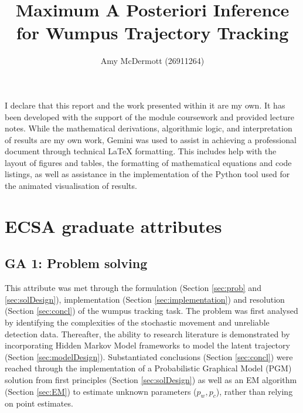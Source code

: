 \documentclass[10pt]{article}
\title{Maximum A Posteriori Inference for Wumpus Trajectory Tracking}
\author{Amy McDermott (26911264)}
\begin{document}
\maketitle
\vspace*{-1.5cm}

\section*{}
I declare that this report and the work presented within it are my own. 
It has been developed with the support of the module coursework and provided lecture notes. 
While the mathematical derivations, algorithmic logic, and interpretation of results are my own work, Gemini 
was used to assist in achieving a professional document through technical LaTeX formatting. 
This includes help with the layout of figures and tables, the formatting of mathematical equations and 
code listings, as well as assistance in the implementation of the Python tool used for the animated visualisation of results.

\section*{ECSA graduate attributes}

\subsection*{GA 1: Problem solving}
This attribute was met through the formulation (Section \ref{sec:prob} and \ref{sec:solDesign}), implementation (Section \ref{sec:implementation}) and resolution (Section \ref{sec:concl}) of the wumpus 
tracking task. The problem was first analysed by identifying the complexities of the stochastic movement and unreliable detection data. 
Thereafter, the ability to research literature is demonstrated by incorporating Hidden Markov Model frameworks to model the latent trajectory (Section \ref{sec:modelDesign}). 
Substantiated conclusions (Section \ref{sec:concl}) were reached through the implementation of a Probabilistic Graphical Model (PGM) solution from first principles (Section \ref{sec:solDesign}) as well as an EM algorithm (Section \ref{sec:EM}) to estimate unknown parameters ($p_w, p_c$), 
rather than relying on point estimates.
\end{document}
